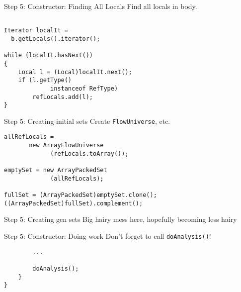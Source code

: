 \begin{slide}{Step 5: Constructor: Finding All Locals}
\vspace*{-0.1in}
Find all locals in body.

\vspace*{-0.1in}
\begin{verbatim}

Iterator localIt = 
  b.getLocals().iterator();

while (localIt.hasNext())
{
    Local l = (Local)localIt.next();
    if (l.getType() 
             instanceof RefType)
        refLocals.add(l);
}
\end{verbatim}
\end{slide}

\begin{slide}{Step 5: Creating initial sets}
\vspace*{-0.1in}
Create {\tt FlowUniverse}, etc.

\vspace*{0.05in}
\begin{verbatim}
allRefLocals = 
       new ArrayFlowUniverse
             (refLocals.toArray());

emptySet = new ArrayPackedSet
             (allRefLocals);

fullSet = (ArrayPackedSet)emptySet.clone();
((ArrayPackedSet)fullSet).complement();
\end{verbatim}
\end{slide}

\begin{slide}{Step 5: Creating gen sets}
Big hairy mess here, hopefully becoming less hairy
\end{slide}

\begin{slide}{Step 5: Constructor: Doing work}
\vspace*{-0.1in}
Don't forget to call {\tt doAnalysis()}!

\vspace*{0.05in}
\begin{verbatim}
        ...

        doAnalysis();
    }
}
\end{verbatim}
\end{slide}


